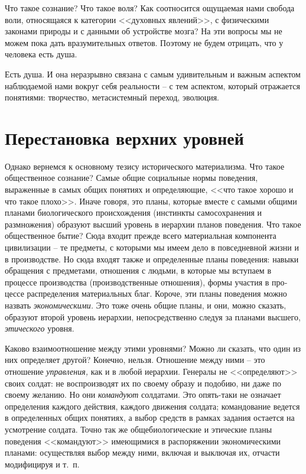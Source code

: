 \documentclass{book}
\begin{document}
Что такое сознание? Что такое воля? Как соотносится ощу­щаемая нами свобода воли, относящаяся к категории <<духовных явлений>>, с 
физическими законами природы и с данными об устройстве мозга? На эти вопросы мы не можем пока дать вразумительных ответов. 
Поэтому не будем отрицать, что у человека есть душа.

Есть душа. И она неразрывно связана с самым удивительным и важным аспектом наблюдаемой нами вокруг себя реальности -- с тем аспектом, который отражается понятиями: творчество, метасистемный переход, эволюция.


\section{Перестановка верхних уровней}

Однако вернемся к основному тезису исторического материализма. Что такое общественное сознание? Самые общие социальные нормы 
поведения, выраженные в самых общих понятиях и определяющие, <<что такое хорошо и что такое плохо>>. Иначе говоря, это планы, 
которые вместе с самыми общими планами биологического происхождения (инстинкты самосохранения и размножения) образуют высший 
уровень в иерархии планов поведения. Что такое общественное бытие? Сюда входит прежде всего материальная компонента цивили­зации 
-- те предметы, с которыми мы имеем дело в повседнев­ной жизни и в производстве. Но сюда входят также и опреде­ленные планы 
поведения: навыки обращения с предметами, отношения с людьми, в которые мы вступаем в процессе произ­водства (производственные 
отношения), формы участия в про­цессе распределения материальных благ. Короче, эти планы по­ведения можно назвать 
\textit{экономическими.}  Это тоже очень общие планы, и они, можно сказать, образуют второй уровень иерар­хии, непосредственно 
следуя за планами высшего, \textit{этического} уровня.

Каково взаимоотношение между этими уровнями? Можно ли сказать, что один из них определяет другой? Конечно, нель­зя. Отношение 
между ними -- это отношение \textit{управления,}  как и в любой иерархии. Генералы не <<определяют>> своих солдат: не 
воспроизводят их по своему образу и подобию, ни даже по своему желанию. Но они \textit{командуют} солдатами. Это опять-таки не 
означает определения каждого действия, каждого движения солдата; командование ведется в определенных об­щих понятиях, а выбор 
средств в рамках задания остается на ус­мотрение солдата. Точно так же общебиологические и этические планы поведения <<командуют>> имеющимися в распоряжении экономическими планами: осуществляя выбор между ними, включая и выключая их, отчасти модифицируя и т.~п.
\end{document}
